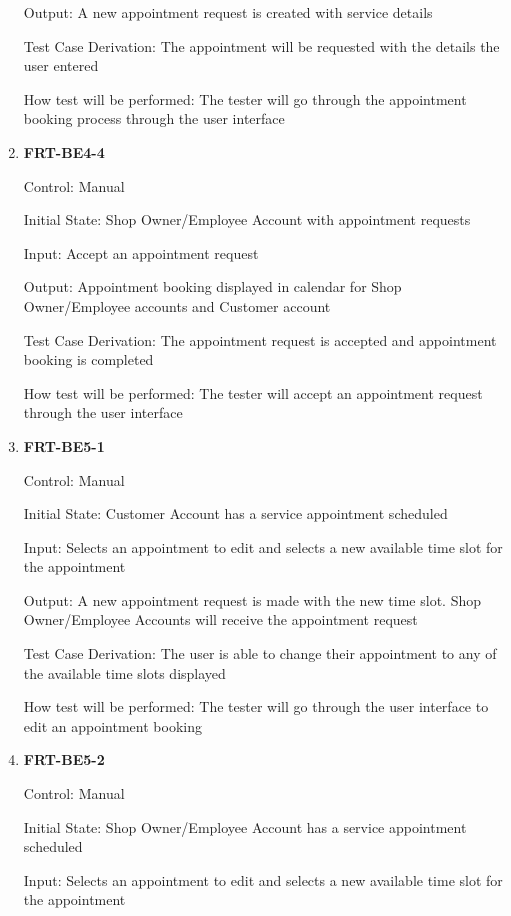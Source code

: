 \documentclass[12pt, titlepage]{article}
\begin{document}
\begin{enumerate}
	      Output: A new appointment request is created with service details

	      Test Case Derivation: The appointment will be requested with the details the user entered

	      How test will be performed: The tester will go through the appointment booking process through the
	      user interface
	      
	\item \textbf{FRT-BE4-4}

	      Control: Manual

	      Initial State: Shop Owner/Employee Account with appointment requests

	      Input: Accept an appointment request

	      Output: Appointment booking displayed in calendar for Shop Owner/Employee accounts and Customer
	      account

	      Test Case Derivation: The appointment request is accepted and appointment booking is completed

	      How test will be performed: The tester will accept an appointment request through the user
	      interface

	\item \textbf{FRT-BE5-1}

	      Control: Manual

	      Initial State: Customer Account has a service appointment scheduled

	      Input: Selects an appointment to edit and selects a new available time slot for the appointment

	      Output: A new appointment request is made with the new time slot. Shop Owner/Employee Accounts will
	      receive the appointment request

	      Test Case Derivation: The user is able to change their appointment to any of the available time
	      slots displayed

	      How test will be performed: The tester will go through the user interface to edit an appointment
	      booking

	\item \textbf{FRT-BE5-2}

	      Control: Manual

	      Initial State: Shop Owner/Employee Account has a service appointment scheduled

	      Input: Selects an appointment to edit and selects a new available time slot for the appointment


\end{enumerate}
\end{document}
